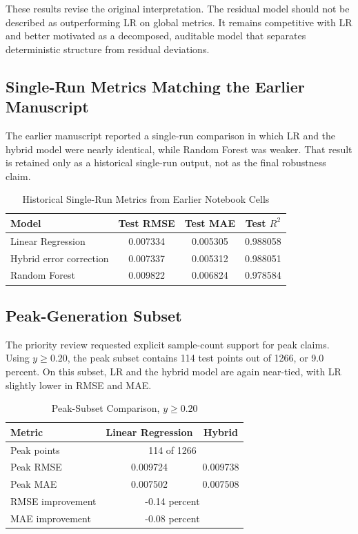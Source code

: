 \documentclass[journal]{IEEEtran}
\begin{document}
These results revise the original interpretation. The residual model should not be described as outperforming LR on global metrics. It remains competitive with LR and better motivated as a decomposed, auditable model that separates deterministic structure from residual deviations.

\subsection{Single-Run Metrics Matching the Earlier Manuscript}
The earlier manuscript reported a single-run comparison in which LR and the hybrid model were nearly identical, while Random Forest was weaker. That result is retained only as a historical single-run output, not as the final robustness claim.

\begin{table}[!t]
\caption{Historical Single-Run Metrics from Earlier Notebook Cells}
\label{tab:single_run}
\centering
\begin{tabular}{lccc}
\toprule
Model & Test RMSE & Test MAE & Test $R^2$ \\
\midrule
Linear Regression & 0.007334 & 0.005305 & 0.988058 \\
Hybrid error correction & 0.007337 & 0.005312 & 0.988051 \\
Random Forest & 0.009822 & 0.006824 & 0.978584 \\
\bottomrule
\end{tabular}
\end{table}

\subsection{Peak-Generation Subset}
The priority review requested explicit sample-count support for peak claims. Using $y \ge 0.20$, the peak subset contains 114 test points out of 1266, or 9.0 percent. On this subset, LR and the hybrid model are again near-tied, with LR slightly lower in RMSE and MAE.

\begin{table}[!t]
\caption{Peak-Subset Comparison, $y \ge 0.20$}
\label{tab:peak_subset}
\centering
\begin{tabular}{lcc}
\toprule
Metric & Linear Regression & Hybrid \\
\midrule
Peak points & \multicolumn{2}{c}{114 of 1266} \\
Peak RMSE & 0.009724 & 0.009738 \\
Peak MAE & 0.007502 & 0.007508 \\
RMSE improvement & \multicolumn{2}{c}{-0.14 percent} \\
MAE improvement & \multicolumn{2}{c}{-0.08 percent} \\
\bottomrule
\end{tabular}
\end{table}
\end{document}
